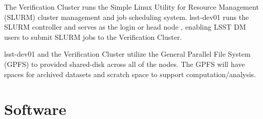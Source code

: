 \documentclass[DM,authoryear,toc]{lsstdoc}
\begin{document}
The Verification Cluster runs the Simple Linux Utility for Resource Management (SLURM) cluster management and job scheduling system. lsst-dev01 runs the SLURM controller and serves as the login or head node , enabling LSST DM users to submit SLURM jobs to the Verification Cluster.

lsst-dev01 and the Verification Cluster utilize the General Parallel File System (GPFS) to provided shared-disk across all of the nodes. The GPFS will have spaces for archived datasets and scratch space to support computation/analysis.



\section{Software}



\end{document}
